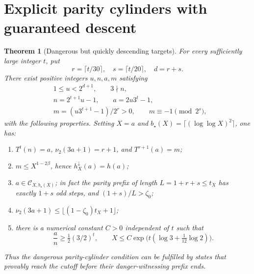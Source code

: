 \documentclass[11pt,a4paper]{article}
\newtheorem{theorem}{Theorem}
\newcommand{\calC}{\mathcal C}
\newcommand{\nuTwo}{\nu_2}
\begin{document}
\section{Explicit parity cylinders with guaranteed descent}
\begin{theorem}[Dangerous but quickly descending targets]\label{thm:construct}
For every sufficiently large integer $t$, put
\[
 r=\lceil t/30\rceil,\quad s=\lceil t/20\rceil,\quad d=r+s.
\]
There exist positive integers $u,n,a,m$ satisfying
\begin{align*}
  &1\le u<2^{d+1},\qquad 3\nmid n,\\
  &n=2^{t+1}u-1,\qquad a=2u3^t-1,\\
  &m=(u3^{t+1}-1)/2^r>0,\qquad m\equiv-1\pmod{2^s},
\end{align*}
with the following properties.  Setting $X=a$ and $b_\star(X)=\lceil(\log\log X)^2\rceil$, one has:
\begin{enumerate}
 \item $T^t(n)=a$, $\nuTwo(3a+1)=r+1$, and $T^{r+1}(a)=m$;
 \item $m\le X^{1-2\beta}$, hence $h_X^\downarrow(a)=h(a)$;
 \item $a\in\calC_{X,b_\star(X)}$; in fact the parity prefix of length $L=1+r+s\le t_X$ has exactly $1+s$ odd steps, and $(1+s)/L>\zeta_0$;
 \item $\nuTwo(3a+1)\le\lfloor(1-\zeta_0)t_X+1\rfloor$;
 \item there is a numerical constant $C>0$ independent of $t$ such that
 \[
 \frac an\ge\tfrac12(3/2)^t,
 \qquad X\le C\exp\bigl(t(\log3+\tfrac1{12}\log2)\bigr).
 \]
\end{enumerate}
Thus the dangerous parity-cylinder condition can be fulfilled by states that provably reach the cutoff \emph{before} their danger-witnessing prefix ends.
\end{theorem}
\end{document}
